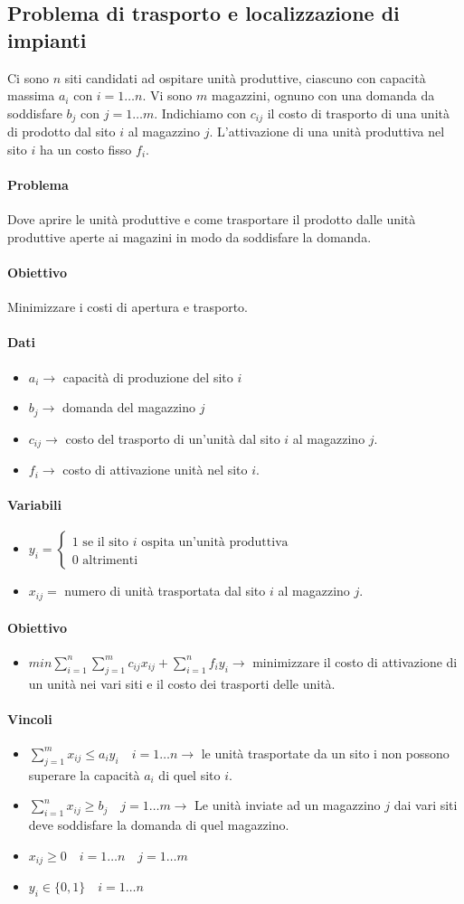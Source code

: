 \documentclass[12pt, twoside, letterpaper]{article}
\newcommand{\problema}[5]{
	#1
	\begin{dati}
		\paragraph{Dati} #2
	\end{dati}
	\begin{variabili}
		\paragraph{Variabili} #3
	\end{variabili}
	\begin{obiettivo}
		\paragraph{Obiettivo} #4
	\end{obiettivo}
	\begin{vincoli}
		\paragraph{Vincoli} #5
	\end{vincoli}
}
\begin{document}
		\subsection{Problema di trasporto e localizzazione di impianti}
			\problema
			{Ci sono $n$ siti candidati ad ospitare unità produttive, ciascuno con capacità massima $a_i$ con $i=1 \dots n$. Vi sono $m$ magazzini, ognuno con una domanda da soddisfare $b_j$ con $j = 1 \dots m$. Indichiamo con $c_{ij}$ il costo di trasporto di una unità di prodotto dal sito $i$ al magazzino $j$. L'attivazione di una unità produttiva nel sito $i$ ha un costo fisso $f_i$. 
			\paragraph{Problema} Dove aprire le unità produttive e come trasportare il prodotto dalle unità produttive aperte ai magazini in modo da soddisfare la domanda.
			\paragraph{Obiettivo} Minimizzare i costi di apertura e trasporto.}
			{\begin{itemize}
				\item $a_i \rightarrow$ capacità di produzione del sito $i$
				\item $b_j \rightarrow$ domanda del magazzino $j$ 
				\item $c_{ij} \rightarrow$ costo del trasporto di un'unità dal sito $i$ al magazzino $j$. 
				\item $f_i \rightarrow$ costo di attivazione unità nel sito $i$.  
			\end{itemize}} 
			{\begin{itemize} 
				\item $y_i = \begin{cases} \text{1 se il sito $i$ ospita un'unità produttiva} \\ \text{0 altrimenti}\end{cases}$
				\item $x_{ij} =$ numero di unità trasportata dal sito $i$ al magazzino $j$.
			\end{itemize}}
			{\begin{itemize}
				\item $min \sum_{i=1}^n \sum_{j=1}^m c_{ij}x_{ij} + \sum_{i=1}^n f_i y_i \rightarrow$ minimizzare il costo di attivazione di un unità nei vari siti e il costo dei trasporti delle unità.
			\end{itemize}}
			{\begin{itemize}
				\item $\sum_{j=1}^m x_{ij} \leq a_i y_i \quad i = 1 \dots n \rightarrow$ le unità trasportate da un sito i non possono superare la capacità $a_i$ di quel sito $i$.
				\item $\sum_{i=1}^n x_{ij} \geq b_j \quad j=1 \dots m \rightarrow$ Le unità inviate ad un magazzino $j$ dai vari siti deve soddisfare la domanda di quel magazzino.
				\item $x_{ij} \geq 0 \quad i=1 \dots n \quad j = 1 \dots m$
				\item $y_i \in \{0,1\} \quad i=1 \dots n$
			\end{itemize}}
						
\end{document}
